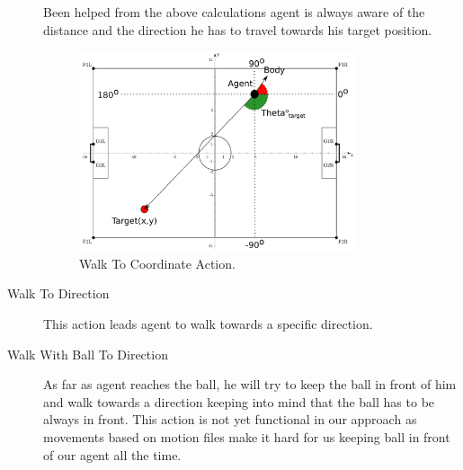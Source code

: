 \begin{description}
Been helped from the above calculations agent is always aware of the distance and the direction he has to travel towards his target position. 
 \begin{figure}[!h]
\centering
  \includegraphics[width=0.8\textwidth]{Chapter3/figures/GoToPos.pdf}
  \caption{Walk To Coordinate Action.}
  \label{fig:WalkToCoordinate}
\end{figure}
 \item[Walk To Direction]
 This action leads agent to walk towards a specific direction.
 \item[Walk With Ball To Direction]
 As far as agent reaches the ball, he will try to keep the ball in front of him and walk towards a direction keeping into mind that the ball has to be always in front. This action is not yet functional in our approach as movements based on motion files make it hard for us keeping ball in front of our agent all the time.
\end{description}

